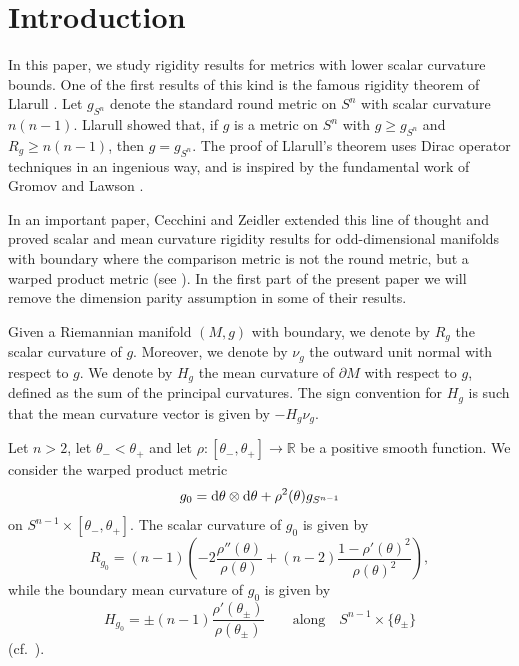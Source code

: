 \documentclass[11pt]{article}
\numberwithin{equation}{section}
\numberwithin{equation}{section}
\newcommand{\R}{\mathbb{R}}
\begin{document}
\section{Introduction}

In this paper, we study rigidity results for metrics with lower scalar curvature bounds.
One of the first results of this kind is the famous rigidity theorem of Llarull \cite{Llarull}.
Let $g_{S^n}$ denote the standard round metric on $S^n$ with scalar curvature $n(n-1)$. Llarull showed that, if $g$ is a metric on $S^n$ with $g \geq g_{S^n}$ and $R_g \geq n(n-1)$, then $g=g_{S^n}$.
The proof of Llarull's theorem uses Dirac operator techniques in an ingenious way, and is inspired by the fundamental work of Gromov and Lawson \cite{Gromov-Lawson1, Gromov-Lawson2}.

In an important paper, Cecchini and Zeidler extended this line of thought and proved scalar and mean curvature rigidity results for odd-dimensional manifolds with boundary where the comparison metric is not the round metric, but a warped product metric (see \cite[Section~10]{Cecchini-Zeidler}).
In the first part of the present paper we will remove the dimension parity assumption in some of their results.

Given a Riemannian manifold $(M,g)$ with boundary, we denote by $R_g$ the scalar curvature of $g$. Moreover, we denote by $\nu_g$ the outward unit normal with respect to $g$.
We denote by $H_g$ the mean curvature of $\partial M$ with respect to $g$, defined as the sum of the principal curvatures.
The sign convention for $H_g$ is such that the mean curvature vector is given by $-H_g\nu_g$.

Let $n>2$, let $\theta_- < \theta_+$ and let $\rho\colon [\theta_- , \theta_+] \to \R$ be a positive smooth function.
We consider the warped product metric
\begin{equation} \label{g_0}
 g_0 = {\rm d}\theta \otimes {\rm d}\theta + \rho^2(\theta) g_{S^{n-1}}
\end{equation}
on $S^{n-1} \times [\theta_- , \theta_+]$. The scalar curvature of $g_0$ is given by
\begin{equation} \label{scal_g_0}
 R_{g_0} = (n-1) \left( -2 \frac{\rho''(\theta)}{\rho(\theta)} + (n-2) \frac{1- \rho'(\theta)^2}{\rho(\theta)^2} \right),
\end{equation}
while the boundary mean curvature of $g_0$ is given by
\begin{equation} \label{mean_g_0}
 H_{g_0} = \pm (n-1) \frac{\rho'(\theta_{\pm})}{\rho(\theta_{\pm})}\qquad \text{along}\quad S^{n-1} \times \{ \theta_{\pm} \}
\end{equation}
(cf.\ \cite[Example~4.1]{Baer-Gauduchon-Moroianu}).
\end{document}
